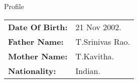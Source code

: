\begin{rubric}{Profile}
\begin{tabular}{@{}ll}
\textbf{Date Of Birth:} & 21 Nov 2002. \\
\textbf{Father Name:} & T.Srinivas Rao. \\
\textbf{Mother Name:} & T.Kavitha. \\
\textbf{Nationality:} & Indian. \\
\end{tabular}
\end{rubric}
